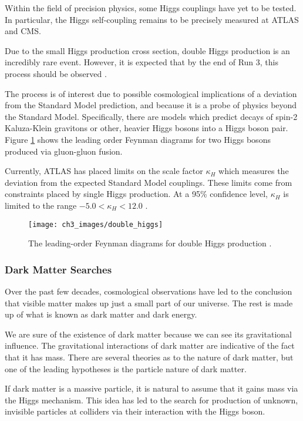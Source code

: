 \documentclass[10pt,a4paper]{book}
\begin{document}
Within the field of precision physics, some Higgs couplings have yet to be tested. In particular, the Higgs self-coupling remains to be precisely measured at ATLAS and CMS. 

Due to the small Higgs production cross section, double Higgs production is an incredibly rare event. However, it is expected that by the end of Run 3, this process should be observed \cite{Chen:2017khz}. 

The process is of interest due to possible cosmological implications of a deviation from the Standard Model prediction, and because it is a probe of physics beyond the Standard Model. Specifically, there are models which predict 
decays of spin-2 Kaluza-Klein gravitons or other, heavier Higgs bosons into a Higgs boson pair. Figure \ref{double Higgs} shows the leading order Feynman diagrams for two Higgs bosons produced via gluon-gluon fusion.
 
Currently, ATLAS has placed limits on the scale factor $\kappa_H$ which measures the deviation from the expected Standard Model couplings. These limits come from constraints placed by single Higgs production. At a 95\% confidence level, $\kappa_H$ is limited to the range $-5.0 < \kappa_H < 12.0$ \cite{ATLAS:2019qdc}.

\begin{figure}
\centering
\texttt{[image: ch3\_images/double\_higgs]}
\caption{The leading-order Feynman diagrams for double Higgs production \cite{ATLAS:2019qdc}.}
\label{double Higgs}
\end{figure}

\subsubsection{Dark Matter Searches}

Over the past few decades, cosmological observations have led to the conclusion that visible matter makes up just a small part of our universe. The rest is made up of what is known as dark matter and dark energy.

We are sure of the existence of dark matter because we can see its gravitational influence. The gravitational interactions of dark matter are indicative of the fact that it has mass. There are several theories as to the nature of dark matter, but one of the leading hypotheses is the particle nature of dark matter.

If dark matter is a massive particle, it is natural to assume that it gains mass via the Higgs mechanism. This idea has led to the search for production of unknown, invisible particles at colliders via their interaction with the Higgs boson. 
\end{document}
